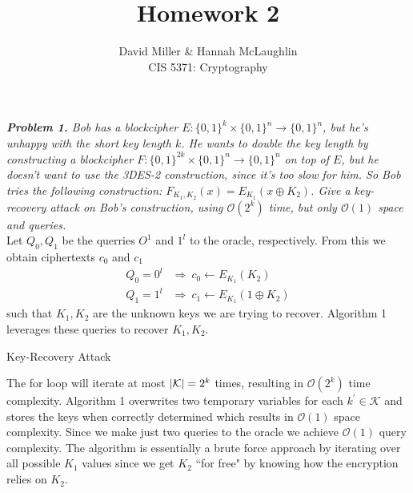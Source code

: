 \documentclass[12pt]{article}
\DeclarePairedDelimiter \abs{\lvert}{\rvert}%
\theoremstyle{remark}
\begin{document}
 
\title{Homework 2}
\author{David Miller \& Hannah McLaughlin \\ 
CIS 5371: Cryptography} 

\maketitle

\textit{\textbf{Problem 1.} Bob has a blockcipher $E : \{0, 1\}^k \times \{0, 1\}^n \rightarrow \{0, 1\}^n$, but he’s unhappy with the short key length $k$. He wants to double the key length by constructing a blockcipher $F : \{0, 1\}^{2k} × \{0, 1\}^n \rightarrow \{0, 1\}^n$ on top of $E$, but he doesn’t want to use the 3DES-2 construction, since it’s too slow for him. So Bob tries the following construction: $F_{K_1,K_2}(x) = E_{K_1} (x \oplus K_2)$. Give a key-recovery attack on Bob’s construction, using $\mathcal{O}(2^k)$ time, but only $\mathcal{O}(1)$ space and queries.} \\

Let $Q_0, Q_1$ be the querries $O^1$ and $1^l$ to the oracle, respectively. From this we obtain ciphertexts $c_0$ and $c_1$
\begin{align}
	Q_0 = 0^l & \Rightarrow \ c_0 \leftarrow E_{K_1}(K_2)\\
    Q_1 = 1^l & \Rightarrow \ c_1 \leftarrow E_{K_1}(1 \oplus K_2)
\end{align}
such that $K_1, K_2$ are the unknown keys we are trying to recover. Algorithm 1 leverages these queries to recover $K_1, K_2$. \\

\begin{algorithm}[H]
	\caption{Key-Recovery Attack}
		\begin{algorithmic}[1]
			\Return{}
			\EndIf
			\EndFor
		\end{algorithmic}
\end{algorithm}
    
The for loop will iterate at most $\abs{\mathcal{K}} = 2^k$ times, resulting in $\mathcal{O}(2^k)$ time complexity. Algorithm 1 overwrites two temporary variables for each $k^\prime \in \mathcal{K}$ and stores the keys when correctly determined which results in $\mathcal{O}(1)$ space complexity.  Since we make just two queries to the oracle we achieve $\mathcal{O}(1)$ query complexity. The algorithm is essentially a brute force approach by iterating over all possible $K_1$ values since we get $K_2$ ``for free" by knowing how the encryption relies on $K_2$.
    
\end{document}
